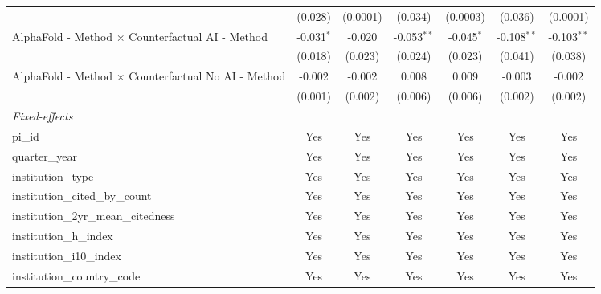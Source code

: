 \begin{tabular}{lcccccc}
                                                               & (0.028)       & (0.0001)      & (0.034)       & (0.0003)      & (0.036)       & (0.0001)\\   
   AlphaFold - Method $\times$ Counterfactual AI - Method      & -0.031$^{*}$  & -0.020        & -0.053$^{**}$ & -0.045$^{*}$  & -0.108$^{**}$ & -0.103$^{**}$\\   
                                                               & (0.018)       & (0.023)       & (0.024)       & (0.023)       & (0.041)       & (0.038)\\   
   AlphaFold - Method $\times$ Counterfactual No AI - Method   & -0.002        & -0.002        & 0.008         & 0.009         & -0.003        & -0.002\\   
                                                               & (0.001)       & (0.002)       & (0.006)       & (0.006)       & (0.002)       & (0.002)\\   
   \midrule
   \emph{Fixed-effects}\\
   pi\_id                                                      & Yes           & Yes           & Yes           & Yes           & Yes           & Yes\\  
   quarter\_year                                               & Yes           & Yes           & Yes           & Yes           & Yes           & Yes\\  
   institution\_type                                           & Yes           & Yes           & Yes           & Yes           & Yes           & Yes\\  
   institution\_cited\_by\_count                               & Yes           & Yes           & Yes           & Yes           & Yes           & Yes\\  
   institution\_2yr\_mean\_citedness                           & Yes           & Yes           & Yes           & Yes           & Yes           & Yes\\  
   institution\_h\_index                                       & Yes           & Yes           & Yes           & Yes           & Yes           & Yes\\  
   institution\_i10\_index                                     & Yes           & Yes           & Yes           & Yes           & Yes           & Yes\\  
   institution\_country\_code                                  & Yes           & Yes           & Yes           & Yes           & Yes           & Yes\\  

\end{tabular}
